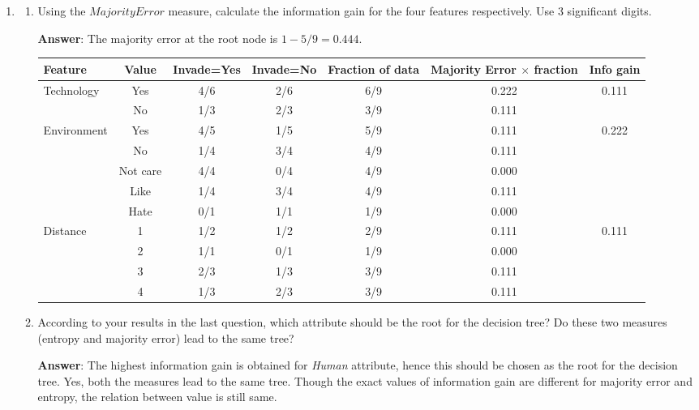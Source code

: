 \documentclass{article}
\begin{document}
\begin{enumerate}
\item 
\begin{enumerate}
    \item Using the $MajorityError$ measure, calculate the information gain for the four features respectively. Use 3 significant digits.
    
    \textbf{Answer}: The majority error at the root node is $1 - 5/9 = 0.444$.  
    
    \begin{table}[H]
    \centering
        \begin{tabular}{|l|ccccc|c|}
            \hline
            Feature & Value & Invade=Yes & Invade=No & Fraction of data & Majority Error $\times$ fraction & Info gain \\ \hline
            \multirow{2}{*}{Technology} & Yes & 4/6 & 2/6 & 6/9 & 0.222 & \multirow{2}{*}{0.111}\\
             & No & 1/3 & 2/3 & 3/9 & 0.111 & \\ \hline
            \multirow{2}{*}{Environment} & Yes & 4/5 & 1/5 & 5/9 & 0.111 & \multirow{2}{*}{0.222}\\
             & No & 1/4 & 3/4 & 4/9 & 0.111 & \\ \hline
            \textbf{\multirow{3}{*}{Human}} & Not care & 4/4 & 0/4 & 4/9 & 0.000 & \textbf{\multirow{2}{*}{0.333}}\\
             & Like & 1/4 & 3/4 & 4/9 & 0.111 & \\
             & Hate & 0/1 & 1/1 & 1/9 & 0.000 & \\ \hline
            \multirow{4}{*}{Distance} & 1 & 1/2 & 1/2 & 2/9 & 0.111 & \multirow{4}{*}{0.111}\\
             & 2 & 1/1 & 0/1 & 1/9 & 0.000 & \\
             & 3 & 2/3 & 1/3 & 3/9 & 0.111 & \\
             & 4 & 1/3 & 2/3 & 3/9 & 0.111 & \\ \hline
        \end{tabular}
    \end{table}
    
    \item According to your results in the last question, which attribute should be the root for the decision tree? Do these two measures (entropy and majority error) lead to the same tree?
    
    \textbf{Answer}: The highest information gain is obtained for {\em Human} attribute, hence this should be chosen as the root for the decision tree.
    Yes, both the measures lead to the same tree. Though the exact values of information gain are different for majority error and entropy, the relation between value is still same.
\end{enumerate}
\end{enumerate}
\end{document}
